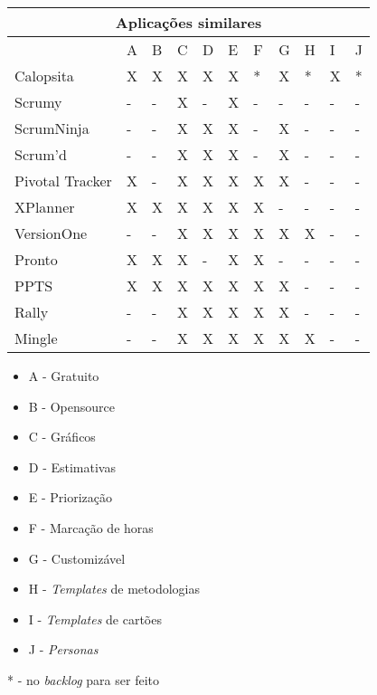\begin{tabular}{|l|l|l|l|l|l|l|l|l|l|l|}
	\hline
	\multicolumn{11}{|c|}{Aplicações similares} \\
	\hline
	                & A & B & C & D & E & F & G & H & I & J \\
	Calopsita       & X & X & X & X & X & * & X & * & X & * \\
	Scrumy          & - & - & X & - & X & - & - & - & - & - \\
	ScrumNinja      & - & - & X & X & X & - & X & - & - & - \\
	Scrum'd         & - & - & X & X & X & - & X & - & - & - \\
	Pivotal Tracker & X & - & X & X & X & X & X & - & - & - \\
	XPlanner        & X & X & X & X & X & X & - & - & - & - \\
	VersionOne      & - & - & X & X & X & X & X & X & - & - \\
	Pronto          & X & X & X & - & X & X & - & - & - & - \\
	PPTS            & X & X & X & X & X & X & X & - & - & - \\
	Rally           & - & - & X & X & X & X & X & - & - & - \\
	Mingle          & - & - & X & X & X & X & X & X & - & - \\
	\hline
\end{tabular}

\begin{itemize}
	\item A - Gratuito
	\item B - Opensource
	\item C - Gráficos
	\item D - Estimativas
	\item E - Priorização
	\item F - Marcação de horas
	\item G - Customizável
	\item H - \textit{Templates} de metodologias
	\item I - \textit{Templates} de cartões
	\item J - \textit{Personas}
\end{itemize}

* - no \textit{backlog} para ser feito

